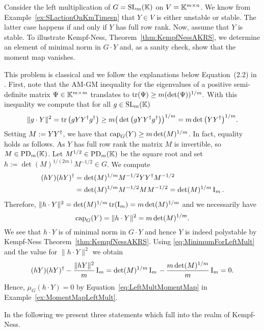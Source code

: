 \begin{example}\label{ex:MinimumForLeftMult}
	Consider the left multiplication of $G = \operatorname{SL}_m(\mathbb K)$ on $V = \mathbb K^{m \times n}$. We know from Example~\ref{ex:SLactionOnKmTimesn} that $Y \in V$ is either unstable or stable. The latter case happens if and only if $Y$ has full row rank. Now, assume that $Y$ is stable. To illustrate Kempf-Ness, Theorem~\ref{thm:KempfNessAKRS}, we determine an element of minimal norm in $G \cdot Y$ and, as a sanity check, show that the moment map vanishes.
	
	This problem is classical and we follow the explanations below Equation~(2.2) in \cite{burgisser2017alternating}.
	First, note that the AM-GM inequality for the eigenvalues of a positive semi-definite matrix $\Psi \in \mathbb K^{m \times m}$ translates to
	$
	\operatorname{tr}(\Psi) \geq m ( \det(\Psi) )^{1/m}.
	$
	With this inequality we compute that for all $g \in \operatorname{SL}_m(\mathbb K)$
	\[ \| g \cdot Y \|^2 = \operatorname{tr} \big( gY Y^{\dagger} g^{\dagger} \big) \geq m \big( \det \big( g Y Y^{\dagger} g^{\dagger} \big) \big)^{1/m}
	= m \det \big( Y Y^{\dagger} \big)^{1/m} .   \]
	Setting $M := Y Y^{\dagger}$, we have that $\operatorname{cap}_{G} (Y) \geq m \det(M)^{1/m}$. In fact, equality holds as follows. As $Y$ has full row rank the matrix $M$ is invertible, so $M \in \operatorname{PD}_m(\mathbb K)$. Let $M^{1/2} \in \operatorname{PD}_m(\mathbb K)$ be the square root and set $h := \det(M)^{1/(2m)} M^{-1/2} \in G$. We compute
		\begin{equation}\label{eq:MinimumForLeftMult}
			\begin{split}
				(hY)(hY)^{\dagger} &= \det(M)^{1/m} M^{-1/2} Y Y^{\dagger} M^{-1/2} \\
				&= \det(M)^{1/m} M^{-1/2} M M^{-1/2} = \det(M)^{1/m} \operatorname{I}_m .
			\end{split}
		\end{equation}
	Therefore, $\| h\cdot Y \|^2 = \det(M)^{1/m} \operatorname{tr}(\operatorname{I}_m) = m \det(M)^{1/m}$ and we necessarily have
		\[ \operatorname{cap}_G(Y) =  \| h \cdot Y \|^2 = m \det(M)^{1/m}. \]
	We see that $h \cdot Y$ is of minimal norm in $G \cdot Y$ and hence $Y$ is indeed polystable by Kempf-Ness Theorem~\ref{thm:KempfNessAKRS}. Using \eqref{eq:MinimumForLeftMult} and the value for $\| h\cdot Y \|^2$ we obtain
		\[ (hY)(hY)^{\dagger} - \frac{\|hY\|^2}{m} \operatorname{I}_m = \det(M)^{1/m} \operatorname{I}_m \, - \, \frac{m \det(M)^{1/m}}{m} \operatorname{I}_m = 0. \]
	Hence, $\mu_G(h \cdot Y) = 0$ by Equation~\eqref{eq:LeftMultMomentMap} in Example~\ref{ex:MomentMapLeftMult}.
	\hfill\exSymbol
\end{example}

In the following we present three statements which fall into the realm of Kempf-Ness.

